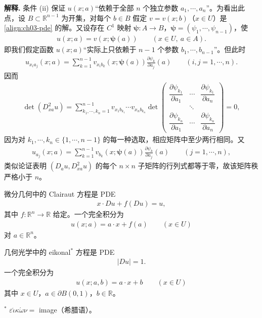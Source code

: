 \documentclass[../../main.tex]{subfiles}
\begin{document}
\textbf{解释.} 条件 (ii) 保证 $u(x;a)$``依赖于全部 $n$ 个独立参数 $a_1,\cdots,a_n$''。为看出此点，设 $B\subset\mathbb{R}^{n-1}$ 为开集，对每个 $b\in B$ 假定 $v=v(x;b)$（$x\in U$）是\eqref{align:ch03-pde} 的解。又设存在 $C^1$ 映射 $\boldsymbol{\psi}:A\to B$，$\boldsymbol{\psi}=(\psi_1,\cdots,\psi_{n-1})$，使
\begin{align}\label{align:ch03-depends-n-1}
u(x;a)=v(x;\boldsymbol{\psi}(a)) \qquad (x\in U,\ a\in A).
\end{align}
即我们假定函数 $u(x;a)$``实际上只依赖于 $n-1$ 个参数 $b_1,\cdots,b_{n-1}$''。但此时
\begin{align*}
u_{x_i a_j}(x;a)=\sum_{k=1}^{n-1}v_{x_i b_k}(x;\boldsymbol{\psi}(a))\frac{\partial\psi_k}{\partial a_j}(a) \qquad (i,j=1,\cdots,n).
\end{align*}
因而
\begin{align*}
\det(D_{xa}^2 u)=\sum_{k_1,\cdots,k_n=1}^{n-1}v_{x_1 b_{k_1}}\cdots v_{x_n b_{k_n}}\det
\begin{pmatrix}
\dfrac{\partial\psi_{k_1}}{\partial a_1} & \cdots & \dfrac{\partial\psi_{k_1}}{\partial a_n}\\
& \ddots & \\
\dfrac{\partial\psi_{k_n}}{\partial a_1} & \cdots & \dfrac{\partial\psi_{k_n}}{\partial a_n}
\end{pmatrix}=0,
\end{align*}
因为对 $k_1,\cdots,k_n\in\{1,\cdots,n-1\}$ 的每一种选取，相应矩阵中至少两行相同。又
\begin{align*}
u_{a_j}(x;a)=\sum_{k=1}^{n-1}v_{b_k}(x;\boldsymbol{\psi}(a))\frac{\partial\psi_k}{\partial a_j}(a) \qquad (j=1,\cdots,n),
\end{align*}
类似论证表明 $(D_a u,D_{xa}^2 u)$ 的每个 $n\times n$ 子矩阵的行列式都等于零，故该矩阵秩严格小于 $n$。

\begin{example}\label{example:ch03-clairaut}
微分几何中的 Clairaut 方程是 PDE
\begin{align}\label{align:ch03-clairaut}
x\cdot Du+f(Du)=u,
\end{align}
其中 $f:\mathbb{R}^n\to\mathbb{R}$ 给定。一个完全积分为
\begin{align}\label{align:ch03-clairaut-int}
u(x;a)=a\cdot x+f(a) \qquad (x\in U)
\end{align}
对 $a\in\mathbb{R}^n$。
\end{example}

\begin{example}\label{example:ch03-eikonal}
几何光学中的 eikonal$^*$ 方程是 PDE
\begin{align}\label{align:ch03-eikonal}
|Du|=1.
\end{align}
一个完全积分为
\begin{align}\label{align:ch03-eikonal-int}
u(x;a,b)=a\cdot x+b \qquad (x\in U)
\end{align}
其中 $x\in U$，$a\in\partial B(0,1)$，$b\in\mathbb{R}$。

\smallskip
\noindent $^*$ $\varepsilon\acute{\iota}\kappa\acute{\omega}\nu=$ image（希腊语）。
\end{example}
\end{document}
